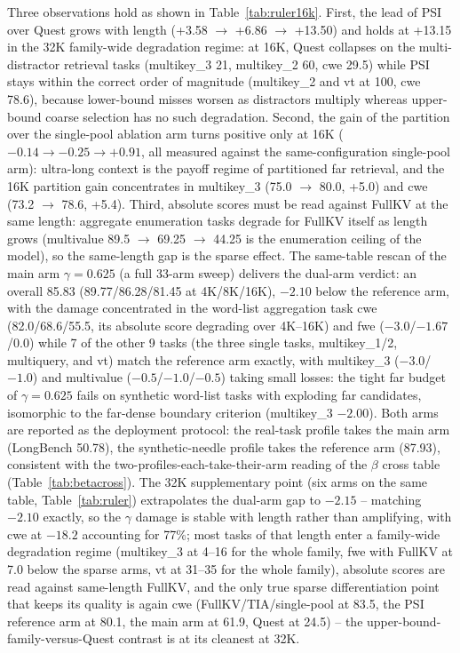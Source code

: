 \documentclass[11pt]{article}
\begin{document}
Three observations hold as shown in Table~\ref{tab:ruler16k}. First, the lead of PSI over Quest grows with length (+3.58 $\rightarrow$ +6.86 $\rightarrow$ +13.50) and holds at +13.15 in the 32K family-wide degradation regime: at 16K, Quest collapses on the multi-distractor retrieval tasks (multikey\_3 21, multikey\_2 60, cwe 29.5) while PSI stays within the correct order of magnitude (multikey\_2 and vt at 100, cwe 78.6), because lower-bound misses worsen as distractors multiply whereas upper-bound coarse selection has no such degradation. Second, the gain of the partition over the single-pool ablation arm turns positive only at 16K ($-0.14 \rightarrow -0.25 \rightarrow +0.91$, all measured against the same-configuration single-pool arm): ultra-long context is the payoff regime of partitioned far retrieval, and the 16K partition gain concentrates in multikey\_3 (75.0 $\rightarrow$ 80.0, +5.0) and cwe (73.2 $\rightarrow$ 78.6, +5.4). Third, absolute scores must be read against FullKV at the same length: aggregate enumeration tasks degrade for FullKV itself as length grows (multivalue 89.5 $\rightarrow$ 69.25 $\rightarrow$ 44.25 is the enumeration ceiling of the model), so the same-length gap is the sparse effect. The same-table rescan of the main arm $\gamma{=}0.625$ (a full 33-arm sweep) delivers the dual-arm verdict: an overall 85.83 (89.77/86.28/81.45 at 4K/8K/16K), $-2.10$ below the reference arm, with the damage concentrated in the word-list aggregation task cwe (82.0/68.6/55.5, its absolute score degrading over 4K--16K) and fwe ($-3.0$/$-1.67$/0.0) while 7 of the other 9 tasks (the three single tasks, multikey\_1/2, multiquery, and vt) match the reference arm exactly, with multikey\_3 ($-3.0$/$-1.0$) and multivalue ($-0.5$/$-1.0$/$-0.5$) taking small losses: the tight far budget of $\gamma{=}0.625$ fails on synthetic word-list tasks with exploding far candidates, isomorphic to the far-dense boundary criterion (multikey\_3 $-2.00$). Both arms are reported as the deployment protocol: the real-task profile takes the main arm (LongBench 50.78), the synthetic-needle profile takes the reference arm (87.93), consistent with the two-profiles-each-take-their-arm reading of the $\beta$ cross table (Table~\ref{tab:betacross}). The 32K supplementary point (six arms on the same table, Table~\ref{tab:ruler}) extrapolates the dual-arm gap to $-2.15$ -- matching $-2.10$ exactly, so the $\gamma$ damage is stable with length rather than amplifying, with cwe at $-18.2$ accounting for 77\%; most tasks of that length enter a family-wide degradation regime (multikey\_3 at 4--16 for the whole family, fwe with FullKV at 7.0 below the sparse arms, vt at 31--35 for the whole family), absolute scores are read against same-length FullKV, and the only true sparse differentiation point that keeps its quality is again cwe (FullKV/TIA/single-pool at 83.5, the PSI reference arm at 80.1, the main arm at 61.9, Quest at 24.5) -- the upper-bound-family-versus-Quest contrast is at its cleanest at 32K.
\end{document}
